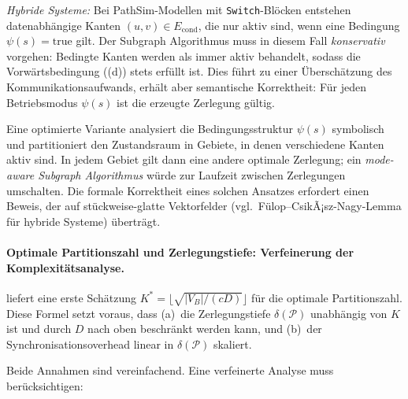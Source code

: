 ﻿\documentclass[12pt,a4paper]{article}
\theoremstyle{definition}
\begin{document}
\emph{Hybride Systeme:} Bei PathSim-Modellen mit
\texttt{Switch}-Blöcken entstehen datenabhängige Kanten
$(u,v) \in E_{\mathrm{cond}}$, die nur aktiv sind, wenn eine Bedingung
$\psi(s) = \mathrm{true}$ gilt. Der Subgraph Algorithmus muss in
diesem Fall \emph{konservativ} vorgehen: Bedingte Kanten werden als
immer aktiv behandelt, sodass die Vorwärtsbedingung ((d))
stets erfüllt ist. Dies führt zu einer Überschätzung des
Kommunikationsaufwands, erhält aber semantische Korrektheit:
Für jeden Betriebsmodus $\psi(s)$ ist die erzeugte Zerlegung gültig.

Eine optimierte Variante analysiert die Bedingungsstruktur
$\psi(s)$ symbolisch und partitioniert den Zustandsraum in
Gebiete, in denen verschiedene Kanten aktiv sind. In jedem
Gebiet gilt dann eine andere optimale Zerlegung; ein
\emph{mode-aware Subgraph Algorithmus} würde zur Laufzeit zwischen
Zerlegungen umschalten. Die formale Korrektheit eines solchen
Ansatzes erfordert einen Beweis, der  auf
stückweise-glatte Vektorfelder (vgl.\ Fülop--CsikÃ¡sz-Nagy-Lemma
für hybride Systeme) überträgt.

\paragraph{Optimale Partitionszahl und Zerlegungstiefe: Verfeinerung der Komplexitätsanalyse.}
 liefert eine erste Schätzung $K^* =
\lfloor\sqrt{|V_B|/(cD)}\rfloor$ für die optimale Partitionszahl.
Diese Formel setzt voraus, dass
(a)~die Zerlegungstiefe $\delta(\mathcal{P})$ unabhängig von $K$ ist und
durch $D$ nach oben beschränkt werden kann, und
(b)~der Synchronisationsoverhead linear in $\delta(\mathcal{P})$ skaliert.

Beide Annahmen sind vereinfachend. Eine verfeinerte Analyse muss berücksichtigen:
\end{document}
